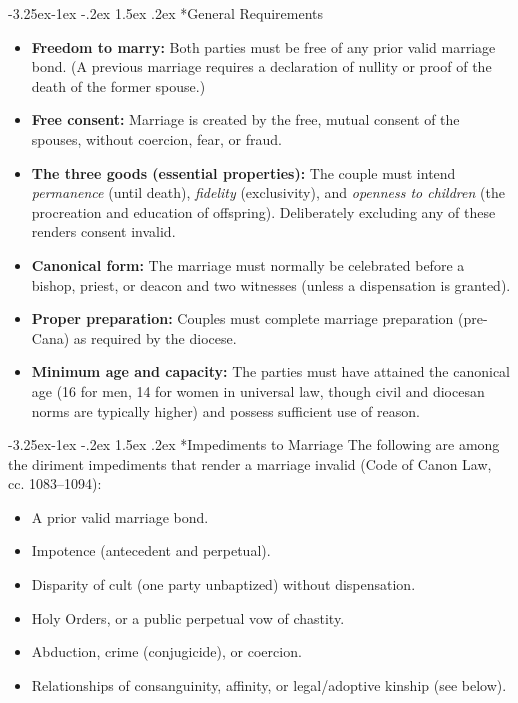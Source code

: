 \documentclass[11pt]{article}
\makeatletter
\renewcommand\subsection{\@startsection{subsection}{2}{\z@}%
  {-3.25ex\@plus -1ex \@minus -.2ex}%
  {1.5ex \@plus .2ex}%
  {\normalfont\large\bfseries\color{churchgold}}}
\makeatother
\begin{document}
\subsection*{General Requirements}
\begin{itemize}
  \item \textbf{Freedom to marry:} Both parties must be free of any prior valid marriage bond. (A previous marriage requires a declaration of nullity or proof of the death of the former spouse.)
  \item \textbf{Free consent:} Marriage is created by the free, mutual consent of the spouses, without coercion, fear, or fraud.
  \item \textbf{The three goods (essential properties):} The couple must intend \emph{permanence} (until death), \emph{fidelity} (exclusivity), and \emph{openness to children} (the procreation and education of offspring). Deliberately excluding any of these renders consent invalid.
  \item \textbf{Canonical form:} The marriage must normally be celebrated before a bishop, priest, or deacon and two witnesses (unless a dispensation is granted).
  \item \textbf{Proper preparation:} Couples must complete marriage preparation (pre-Cana) as required by the diocese.
  \item \textbf{Minimum age and capacity:} The parties must have attained the canonical age (16 for men, 14 for women in universal law, though civil and diocesan norms are typically higher) and possess sufficient use of reason.
\end{itemize}

\subsection*{Impediments to Marriage}
The following are among the diriment impediments that render a marriage
invalid (Code of Canon Law, cc. 1083--1094):
\begin{itemize}
  \item A prior valid marriage bond.
  \item Impotence (antecedent and perpetual).
  \item Disparity of cult (one party unbaptized) without dispensation.
  \item Holy Orders, or a public perpetual vow of chastity.
  \item Abduction, crime (conjugicide), or coercion.
  \item Relationships of consanguinity, affinity, or legal/adoptive kinship (see below).
\end{itemize}
\end{document}
